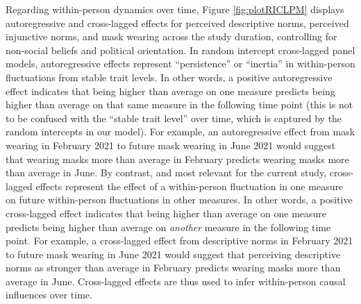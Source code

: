 \documentclass[
  man, donotrepeattitle,floatsintext]{apa6}
\begin{document}
Regarding within-person dynamics over time, Figure \ref{fig:plotRICLPM} displays autoregressive and cross-lagged effects for perceived descriptive norms, perceived injunctive norms, and mask wearing across the study duration, controlling for non-social beliefs and political orientation. In random intercept cross-lagged panel models, autoregressive effects represent ``persistence'' or ``inertia'' in within-person fluctuations from stable trait levels. In other words, a positive autoregressive effect indicates that being higher than average on one measure predicts being higher than average on that same measure in the following time point (this is not to be confused with the ``stable trait level'' over time, which is captured by the random intercepts in our model). For example, an autoregressive effect from mask wearing in February 2021 to future mask wearing in June 2021 would suggest that wearing masks more than average in February predicts wearing masks more than average in June. By contrast, and most relevant for the current study, cross-lagged effects represent the effect of a within-person fluctuation in one measure on future within-person fluctuations in other measures. In other words, a positive cross-lagged effect indicates that being higher than average on one measure predicts being higher than average on \emph{another} measure in the following time point. For example, a cross-lagged effect from descriptive norms in February 2021 to future mask wearing in June 2021 would suggest that perceiving descriptive norms as stronger than average in February predicts wearing masks more than average in June. Cross-lagged effects are thus used to infer within-person causal influences over time.
\end{document}

